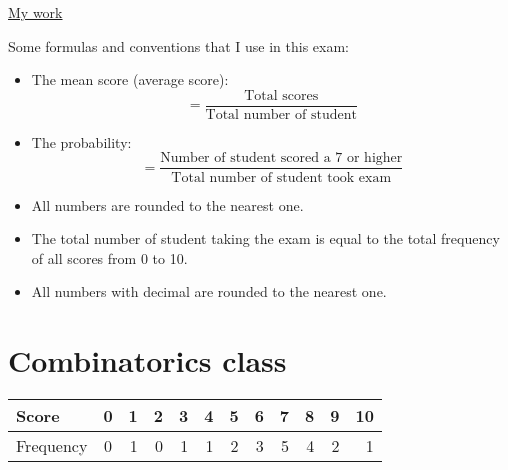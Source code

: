 \documentclass[12pt]{article}
\begin{document}
\newpage

\begin{center}
    \underline {\Large {My work} }
\end{center}

Some formulas and conventions that I use in this exam:
\begin{itemize}
    \item The mean score (average score):
    $$=\frac{\text{Total scores}}{\text{Total number of student}}$$
    \item The probability: 
    $$=\frac{\text{Number of student scored a 7 or higher}}{\text{Total number of student took exam}}$$
    \item All numbers are rounded to the nearest one.
    \item The total number of student taking the exam is equal to the total frequency of all scores from 0 to 10.
    \item All numbers with decimal are rounded to the nearest one.
\end{itemize}


\section*{Combinatorics class}
    \begin{center}
    \begin{tabular}{l | c*{10}r}
        Score &0 &1 &2 &3 &4 &5 &6 &7 &8 &9 &10 \\
        \hline
        Frequency &0 &1 &0 &1 &1 &2 &3 &5 &4 &2 &1
    \end{tabular}
    \end{center}
\end{document}
